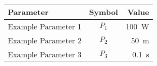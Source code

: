 \documentclass[preview,convert,convert={outext=.png,command=\unexpanded{pdftocairo -r 600 -png \infile}}]{standalone}
\begin{document}
\thispagestyle{empty}
\begin{table}[htbp]
    \centering
    \label{tab:exampletable}
    \begin{tabular}{lcr}
        \toprule
        Parameter & Symbol & Value \\
        \midrule
        Example Parameter 1 & $P_1$ & \SI{100}{\watt} \\
        Example Parameter 2 & $P_2$ & \SI{50}{\meter} \\
        Example Parameter 3 & $P_3$ & \SI{0.1}{\second} \\
        \bottomrule
    \end{tabular}
\end{table}
\end{document}
